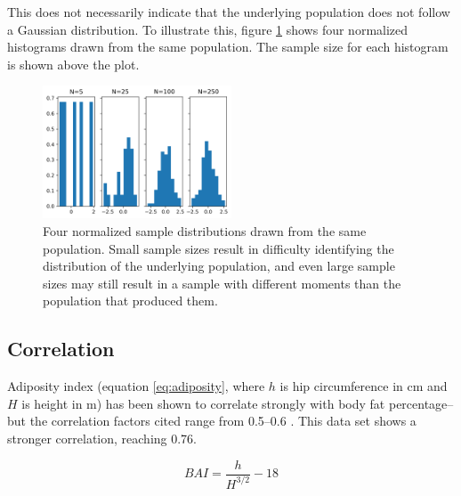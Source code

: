 \documentclass{IEEEtran}
\begin{document}
This does not necessarily indicate that the underlying population does not follow a Gaussian distribution. To illustrate this, figure \ref{fig:sample_size} shows four normalized histograms drawn from the same population. The sample size for each histogram is shown above the plot. 

\begin{centering}
\begin{figure}
\centering
\begin{center}
	\includegraphics[width=0.5\textwidth]{sample_size}
	\caption{Four normalized sample distributions drawn from the same population. Small sample sizes result in difficulty identifying the distribution of the underlying population, and even large sample sizes may still result in a sample with different moments than the population that produced them.\label{fig:sample_size}}
\end{center}
\end{figure}
\end{centering}

\subsection{Correlation}

Adiposity index (equation \ref{eq:adiposity}, where $h$ is hip circumference in \si{\centi\meter} and $H$ is height in \si{\meter}) has been shown to correlate strongly with body fat percentage--but the correlation factors cited range from \numrange{0.5}{0.6} \cite{Bergman2011}. This data set shows a stronger correlation, reaching \num{0.76}.

\begin{equation}
	BAI = \frac{h}{H^{3/2}}-18
	\label{eq:adiposity}
\end{equation}
\end{document}
